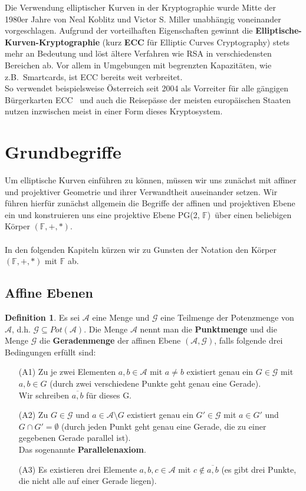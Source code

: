 \documentclass[hidelinks]{article}
\theoremstyle{plain}
\theoremstyle{definition}
\newtheorem{defn}[thm]{Definition}
\theoremstyle{rem}
\newcommand{\pgtwo}{PG(2, $\mathbb{F}$)\ }
\begin{document}
\begin{sloppypar}
Die Verwendung elliptischer Kurven in der Kryptographie wurde Mitte der 1980er Jahre von Neal Koblitz\cite{koblitz} und Victor S. Miller\cite{miller} unabhängig voneinander vorgeschlagen. Aufgrund der vorteilhaften Eigenschaften gewinnt die \textbf{Elliptische-Kurven-Kryptographie} (kurz \textbf{ECC} für Elliptic Curves Cryptography) stets mehr an Bedeutung und löst ältere Verfahren wie RSA in verschiedensten Bereichen ab. Vor allem in Umgebungen mit begrenzten Kapazitäten, wie z.B.\ Smartcards, ist ECC bereits weit verbreitet.\\
So verwendet beispielsweise Österreich seit 2004 als Vorreiter für alle gängigen Bürgerkarten ECC~\cite{austria} und auch die Reisepässe der meisten europäischen Staaten nutzen inzwischen meist in einer Form dieses Kryptosystem.\cite{eu}

\section{Grundbegriffe}
Um elliptische Kurven einführen zu können, müssen wir uns zunächst mit affiner und projektiver Geometrie und ihrer Verwandtheit auseinander setzen. Wir führen hierfür zunächst allgemein die Begriffe der affinen und projektiven Ebene ein und konstruieren uns eine projektive Ebene \pgtwo über einen beliebigen Körper $(\mathbb{F},+,*)$.\\\\
In den folgenden Kapiteln kürzen wir zu Gunsten der Notation den Körper $(\mathbb{F},+,*)$ mit $\mathbb{F}$ ab.\\


\subsection{Affine Ebenen}
\begin{defn}  \label{affine-ebene}
Es sei $\mathcal{A}$ eine Menge und $\mathcal{G}$ eine Teilmenge der Potenzmenge von $\mathcal{A}$, d.h. $\mathcal{G}\subseteq Pot(\mathcal{A})$.
Die Menge $\mathcal{A}$ nennt man die \textbf{Punktmenge} und die Menge $\mathcal{G}$ die \textbf{Geradenmenge} der affinen Ebene $(\mathcal{A},\mathcal{G})$, falls folgende drei Bedingungen erfüllt sind:
	\begin{enumerate}
		\item[(A1)] Zu je zwei Elementen $a, b\in \mathcal{A}$ mit $a\ne b$ existiert genau ein $G\in\mathcal{G}$ mit $a, b \in G$ (durch zwei verschiedene Punkte geht genau eine Gerade).\\
		Wir schreiben $\overline{a,b}$ für dieses G.
		\item[(A2)] Zu $G\in\mathcal{G}$ und $a\in\mathcal{A}\setminus G$ existiert genau ein $G'\in\mathcal{G}$ mit $a\in G'$ und $G\cap G'=\emptyset$ (durch jeden Punkt geht genau eine Gerade, die zu einer gegebenen Gerade parallel ist).\\
		Das sogenannte \textbf{Parallelenaxiom}.
		\item[(A3)] Es existieren drei Elemente $a,b,c\in\mathcal{A}$ mit $c\notin\overline{a,b}$ (es gibt drei Punkte, die nicht alle auf einer Gerade liegen).
	\end{enumerate}
\end{defn}


\end{sloppypar}
\end{document}
